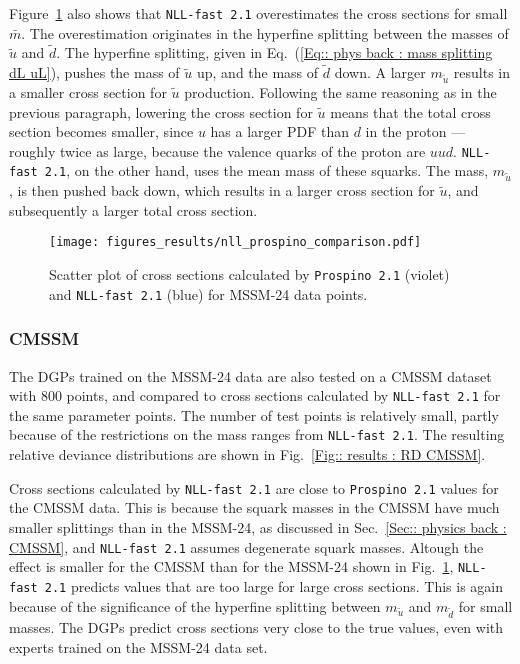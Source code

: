 \documentclass[twoside,english]{uiofysmaster}
\begin{document}
{{Figure~\ref{Fig:: results : Scatter plot MSSM-24 prospino nll} also shows that \verb|NLL-fast 2.1| overestimates the cross sections for small $\bar{m}$. The overestimation originates in the hyperfine splitting between the masses of $\widetilde{u}$ and $\widetilde{d}$. The hyperfine splitting, given in Eq.~(\ref{Eq:: phys back : mass splitting dL uL}), pushes the mass of $\widetilde{u}$ up, and the mass of $\widetilde{d}$ down. A larger $m_{\widetilde{u}}$ results in a smaller cross section for $\widetilde{u}$ production. Following the same reasoning as in the previous paragraph, lowering the cross section for $\widetilde{u}$ means that the total cross section becomes smaller, since $u$ has a larger PDF than $d$ in the proton --- roughly twice as large, because the valence quarks of the proton are $uud$. \verb|NLL-fast 2.1|, on the other hand, uses the mean mass of these squarks. The mass, $m_{\widetilde{u}}$, is then pushed back down, which results in a larger cross section for $\widetilde{u}$, and subsequently a larger total cross section. 

\begin{figure}
\centering
\texttt{[image: figures\_results/nll\_prospino\_comparison.pdf]}
\caption[Scatter plot of cross sections for the MSSM-24]{Scatter plot of cross sections calculated by {\tt  Prospino 2.1} (violet) and {\tt NLL-fast 2.1} (blue) for MSSM-24 data points.}
\label{Fig:: results : Scatter plot MSSM-24 prospino nll}
\end{figure}

\subsubsection{CMSSM}

The DGPs trained on the MSSM-24 data are also tested on a CMSSM dataset with 800 points, and compared to cross sections calculated by \verb|NLL-fast 2.1| for the same parameter points. The number of test points is relatively small, partly because of the restrictions on the mass ranges from \verb|NLL-fast 2.1|. The resulting relative deviance distributions are shown in Fig.~\ref{Fig:: results : RD CMSSM}. 

Cross sections calculated by \verb|NLL-fast 2.1| are close to \verb|Prospino 2.1| values for the CMSSM data. This is because the squark masses in the CMSSM have much smaller splittings than in the MSSM-24, as discussed in Sec.~\ref{Sec:: physics back : CMSSM}, and \verb|NLL-fast 2.1| assumes degenerate squark masses. Altough the effect is smaller for the CMSSM than for the MSSM-24 shown in Fig.~\ref{Fig:: results : Scatter plot MSSM-24 prospino nll}, \verb|NLL-fast 2.1| predicts values that are too large for large cross sections. This is again because of the significance of the hyperfine splitting between $m_{\widetilde{u}}$ and $m_{\widetilde{d}}$ for small masses. The DGPs predict cross sections very close to the true values, even with experts trained on the MSSM-24 data set. 

}}
\end{document}
